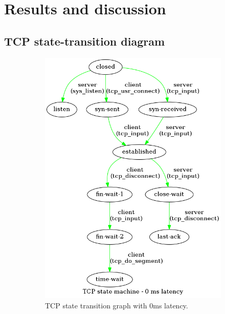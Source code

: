 \documentclass[a4paper,10pt]{article}
\begin{document}
\section{Results and discussion}

\subsection{TCP state-transition diagram}
\begin{figure}[]
\begin{subfigure}{.25\textwidth}
    \centering
    \includegraphics[width=\textwidth]{images/TCP_state_machine_0_ms.png}
    \caption{TCP state transition graph with 0ms latency.}
    \label{fig:0ms_latency}
\end{subfigure}%
\qquad
\begin{subfigure}{.25\textwidth}
   \centering

\end{subfigure}
\end{figure}
\end{document}
